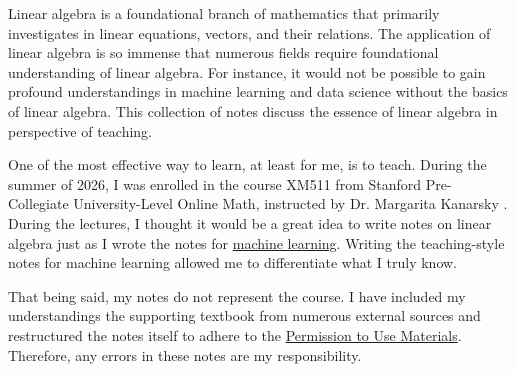 \documentclass[../main.tex]{subfiles}
\begin{document}
Linear algebra is a foundational branch of mathematics that
primarily investigates in linear equations, vectors, and their
relations. The application of linear algebra is so immense that
numerous fields require foundational understanding of linear
algebra. For instance, it would not be possible to gain
profound understandings in machine learning and data science
without the basics of linear algebra. This collection of notes
discuss the essence of linear algebra in perspective of teaching.

One of the most effective way to learn, at least for me, is to
teach. During the summer of 2026, I was enrolled in the course
XM511 from Stanford Pre-Collegiate University-Level Online Math,
instructed by Dr. Margarita Kanarsky \cite{course}. During the
lectures, I thought it would be a great idea to write notes on linear
algebra just as I wrote the notes for
\href{https://github.com/enochyu-official/LibreNotebook}{machine learning}.
Writing the teaching-style notes for machine learning allowed
me to differentiate what I truly know.

That being said, my notes do not represent the course. I have
included my understandings the supporting textbook \cite{textbook}
from numerous external sources and restructured the notes itself to
adhere to the \href{https://www.stanford.edu/site/terms/}{Permission
to Use Materials}. Therefore, any errors in these notes are my
responsibility.
\end{document}
